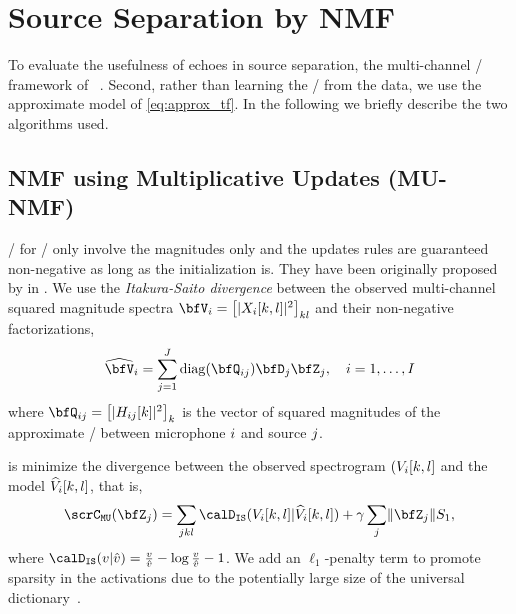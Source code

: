 \section{Source Separation by NMF}
To evaluate the usefulness of echoes in source separation, the multi-channel \NMF/ framework of \citeauthor{ozerov2010multichannel}~.
Second, rather than learning the \RTF/ from the data, we use the approximate model of \eqref{eq:approx_tf}.
In the following we briefly describe the two algorithms used.

\subsection{NMF using Multiplicative Updates (MU-NMF)}\label{sec:separake:mu}
\MUdef/ for \NMF/ only involve the magnitudes only and the updates rules are guaranteed non-negative as long as the initialization is.
They have been originally proposed by in .
We use the \textit{Itakura-Saito divergence}  between the observed multi-channel squared magnitude spectra $\mV_\idxMic = \klist{\powerOf{\MIC_\idxMic[k,l]}}_{kl}$ and their non-negative factorizations,
\begin{equation}
    \label{eq:mu_nmf}
    \wh{\mV}_\idxMic = \sum_{\idxSrc=1}^{\numSrcs} \diag(\vQ_{\idxMicSrc}) \mD_\idxSrc \mZ_\idxSrc , \quad \idxMic=1,\ldots,\numMics
\end{equation}
where $\vQ_{\idxMicSrc} = \klist{\powerOf{H_{\idxMicSrc}[k]}}_k$ is the vector of squared magnitudes of the approximate \RTF/ between microphone $i$ and source $j$.

 is minimize the divergence between the observed spectrogram $(V_{i}[k,l]$ and the model $\widehat{V}_{i}[k,l]$, that is,
\begin{equation}
    \scrC_{\mathtt{MU}}(\mZ_\idxSrc) = \sum_{\idxSrc k l} \calD_{\mathtt{IS}}(V_{\idxMic}[k,l] | \wh{V}_{\idxMic}[k,l])
    + \gamma \sum_\idxSrc \kvvbar{\mZ_\idxSrc}S_1,
\end{equation}
where $\calD_{\mathtt{IS}}( v | \hat{v} ) = \frac{v}{\hat{v}} - \log \frac{v}{\hat{v}} - 1$.
We add an $\ell_1$-penalty term to promote sparsity in the activations due to the potentially large size of the universal dictionary~.

